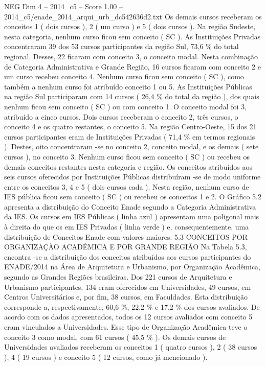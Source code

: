 \begin{textsample}{NEG Dim 4 – 2014\_c5 – Score 1.00 – 2014\_c5/enade\_2014\_arqui\_urb\_dc542636d2.txt}
Os demais cursos receberam os conceitos 1 ( dois cursos ), 2 ( um curso ) e 5 ( dois cursos ).
Na região Sudeste, nesta categoria, nenhum curso ficou sem conceito ( SC ).
As Instituições Privadas concentraram 39 dos 53 cursos participantes da região Sul, 73,6 \% do total regional.
Desses, 22 ficaram com conceito 3, o conceito modal.
Nesta combinação de Categoria Administrativa e Grande Região, 16 cursos ficaram com conceito 2 e um curso recebeu conceito 4.
Nenhum curso ficou sem conceito ( SC ), como também a nenhum curso foi atribuído conceito 1 ou 5.
As Instituições Públicas na região Sul participaram com 14 cursos ( 26,4 \% do total da região ), dos quais nenhum ficou sem conceito ( SC ) ou com conceito 1.
O conceito modal foi 3, atribuído a cinco cursos.
Dois cursos receberam o conceito 2, três cursos, o conceito 4 e os quatro restantes, o conceito 5.
Na região Centro-Oeste, 15 dos 21 cursos participantes eram de Instituições Privadas ( 71,4 \% em termos regionais ).
Destes, oito concentraram -se no conceito 2, conceito modal, e os demais ( sete cursos ), no conceito 3.
Nenhum curso ficou sem conceito ( SC ) ou recebeu os demais conceitos restantes nesta categoria e região.
Os conceitos atribuídos aos seis cursos oferecidos por Instituições Públicas distribuíram -se de modo uniforme entre os conceitos 3, 4 e 5 ( dois cursos cada ).
Nesta região, nenhum curso de IES pública ficou sem conceito ( SC ) ou recebeu os conceitos 1 e 2.
O Gráfico 5.2 apresenta a distribuição do Conceito Enade segundo a Categoria Administrativa da IES.
Os cursos em IES Públicas ( linha azul ) apresentam uma poligonal mais à direita do que os em IES Privadas ( linha verde ) e, consequentemente, uma distribuição de Conceitos Enade com valores maiores. 5.3 CONCEITOS POR ORGANIZAÇÃO ACADÊMICA E POR GRANDE REGIÃO Na Tabela 5.3, encontra -se a distribuição dos conceitos atribuídos aos cursos participantes do ENADE/2014 na Área de Arquitetura e Urbanismo, por Organização Acadêmica, segundo as Grandes Regiões brasileiras.
Dos 221 cursos de Arquitetura e Urbanismo participantes, 134 eram oferecidos em Universidades, 49 cursos, em Centros Universitários e, por fim, 38 cursos, em Faculdades.
Esta distribuição corresponde a, respectivamente, 60,6 \%, 22,2 \% e 17,2 \% dos cursos avaliados.
De acordo com os dados apresentados, todos os 12 cursos avaliados com conceito 5 eram vinculados a Universidades.
Esse tipo de Organização Acadêmica teve o conceito 3 como modal, com 61 cursos ( 45,5 \% ).
Os demais cursos de Universidades avaliados receberam os conceitos 1 ( quatro cursos ), 2 ( 38 cursos ), 4 ( 19 cursos ) e conceito 5 ( 12 cursos, como já mencionado ).

\end{textsample}
